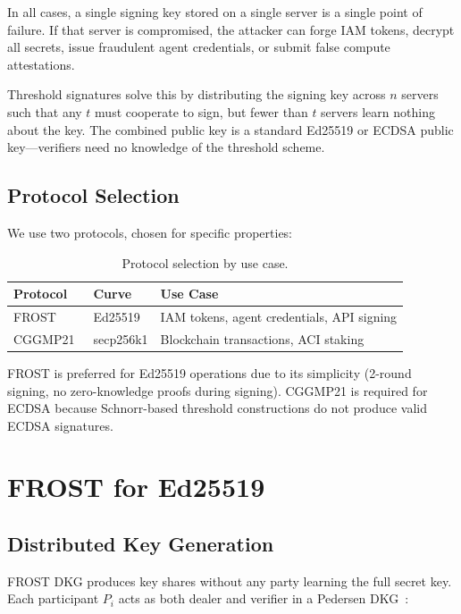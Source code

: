 \documentclass[11pt]{article}
\begin{document}
In all cases, a single signing key stored on a single server is a single point
of failure. If that server is compromised, the attacker can forge IAM tokens,
decrypt all secrets, issue fraudulent agent credentials, or submit false compute
attestations.

Threshold signatures solve this by distributing the signing key across $n$
servers such that any $t$ must cooperate to sign, but fewer than $t$ servers
learn nothing about the key. The combined public key is a standard Ed25519 or
ECDSA public key---verifiers need no knowledge of the threshold scheme.

\subsection{Protocol Selection}

We use two protocols, chosen for specific properties:

\begin{table}[H]
\centering
\small
\begin{tabular}{lll}
\toprule
\textbf{Protocol} & \textbf{Curve} & \textbf{Use Case} \\
\midrule
FROST~\cite{frost} & Ed25519 & IAM tokens, agent credentials, API signing \\
CGGMP21~\cite{cggmp21} & secp256k1 & Blockchain transactions, ACI staking \\
\bottomrule
\end{tabular}
\caption{Protocol selection by use case.}
\label{tab:protocols}
\end{table}

FROST is preferred for Ed25519 operations due to its simplicity (2-round
signing, no zero-knowledge proofs during signing). CGGMP21 is required for
ECDSA because Schnorr-based threshold constructions do not produce valid ECDSA
signatures.

\section{FROST for Ed25519}
\label{sec:frost}

\subsection{Distributed Key Generation}

FROST DKG produces key shares without any party learning the full secret key.
Each participant $P_i$ acts as both dealer and verifier in a Pedersen
DKG~\cite{pedersen1991}:
\end{document}
